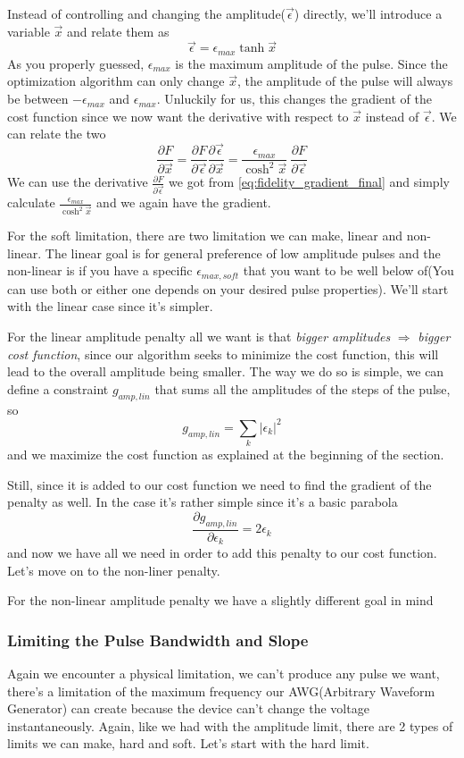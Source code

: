 \documentclass[english, a4paper, 12pt, twoside]{article}
\numberwithin{equation}{section} %
\begin{document}
Instead of controlling and changing the amplitude($\vec{\epsilon}$) directly, we'll introduce a variable $\vec{x}$ and relate them as
$$\vec{\epsilon} = \epsilon_{max}\tanh{\vec{x}}$$
As you properly guessed, $\epsilon_{max}$ is the maximum amplitude of the pulse.
Since the optimization algorithm can only change $\vec{x}$, the amplitude of the pulse will always be between $-\epsilon_{max}$ and $\epsilon_{max}$. Unluckily for us, this changes the gradient of the cost function since we now want the derivative with respect to $\vec{x}$ instead of $\vec{\epsilon}$. We can relate the two
\[
\frac{\partial F}{\partial \vec{x}} = \frac{\partial F}{\partial \vec{\epsilon}}\frac{\partial \vec{\epsilon}}{\partial \vec{x}} = \frac{\epsilon_{max}}{\cosh^2{\vec{x}}} \ \frac{\partial F}{\partial \vec{\epsilon}}
\]
We can use the derivative $\frac{\partial F}{\partial \vec{\epsilon}}$ we got from \ref{eq:fidelity_gradient_final} and simply calculate $\frac{\epsilon_{max}}{\cosh^2{\vec{x}}}$ and we again have the gradient.

For the soft limitation, there are two limitation we can make, linear and non-linear. The linear goal is for general preference of low amplitude pulses and the non-linear is if you have a specific \(\epsilon_{max,soft}\) that you want to be well below of(You can use both or either one depends on your desired pulse properties). We'll start with the linear case since it's simpler.

For the linear amplitude penalty all we want is that \textit{bigger amplitudes} \(\Rightarrow\) \textit{bigger cost function}, since our algorithm seeks to minimize the cost function, this will lead to the overall amplitude being smaller. The way we do so is simple, we can define a constraint \(g_{amp,lin}\) that sums all the amplitudes of the steps of the pulse, so
\[
    g_{amp,lin} = \sum_k |\epsilon_k|^2
\]
and we maximize the cost function as explained at the beginning of the section.

Still, since it is added to our cost function we need to find the gradient of the penalty as well. In the case it's rather simple since it's a basic parabola
\[
    \frac{\partial g_{amp,lin}}{\partial \epsilon_k} = 2\epsilon_k
\]
and now we have all we need in order to add this penalty to our cost function. Let's move on to the non-liner penalty.

For the non-linear amplitude penalty we have a slightly different goal in mind


\subsubsection{Limiting the Pulse Bandwidth and Slope}
Again we encounter a physical limitation, we can't produce any pulse we want, there's a limitation of the maximum frequency our AWG(Arbitrary Waveform Generator) can create because the device can't change the voltage instantaneously. Again, like we had with the amplitude limit, there are 2 types of limits we can make, hard and soft. Let's start with the hard limit.
\end{document}
